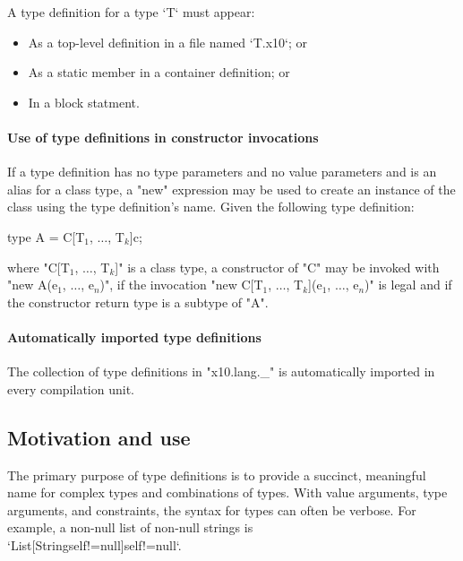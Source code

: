 A type definition for a type \xcd`T` must appear: 
\begin{itemize}
\item As a top-level definition in a file named \xcd`T.x10`; or
\item As a static member in a container definition; or
\item In a block statment.
\end{itemize}


\paragraph{Use of type definitions in constructor invocations}
If a type definition has no type parameters and no value
parameters and is an alias for a class type, a \xcd"new"
expression may be used to create an instance of the class using
the type definition's name.
Given the following type definition:
\begin{xtenmath}
type A = C[T$_1$, $\dots$, T$_k$]{c};
\end{xtenmath}
where 
\xcdmath"C[T$_1$, $\dots$, T$_k$]" is a
class type, a constructor of \xcdmath"C" may be invoked with
\xcdmath"new A(e$_1$, $\dots$, e$_n$)", if the
invocation
\xcdmath"new C[T$_1$, $\dots$, T$_k$](e$_1$, $\dots$, e$_n$)" is
legal and if the constructor return type is a subtype of
\xcd"A".

\paragraph{Automatically imported type definitions}
\label{X10LangUnderscore}

The collection of type definitions in
\xcdmath"x10.lang._" is automatically imported in every compilation unit.


\subsection{Motivation and use}
The primary purpose of type definitions is to provide a succinct,
meaningful name for complex types
and combinations of types. 
With value arguments, type arguments, and constraints, the syntax for \Xten{}
types can often be verbose. 
For example, a non-null list of non-null strings is \\
\xcd`List[String{self!=null}]{self!=null}`.

